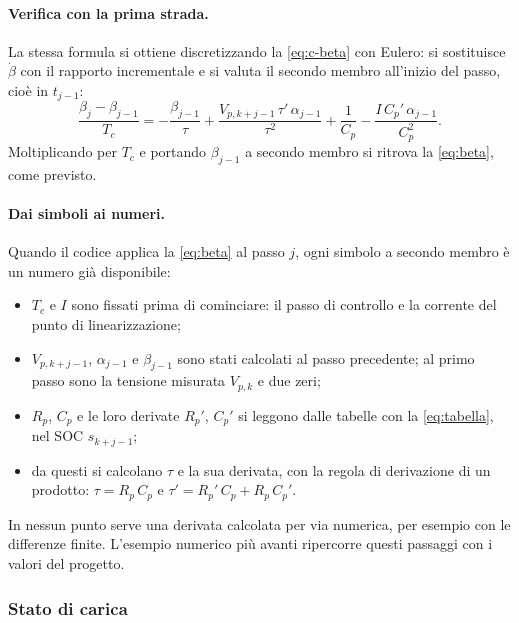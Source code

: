 \documentclass[11pt,a4paper]{article}
\newcommand{\Tc}{T_c}
\begin{document}
\paragraph{Verifica con la prima strada.} La stessa formula si ottiene
discretizzando la \eqref{eq:c-beta} con Eulero: si sostituisce $\dot\beta$ con
il rapporto incrementale e si valuta il secondo membro all'inizio del passo,
cioè in $t_{j-1}$:
\[
  \frac{\beta_j - \beta_{j-1}}{\Tc}
    = -\frac{\beta_{j-1}}{\tau}
      + \frac{V_{p,k+j-1}\,\tau'\,\alpha_{j-1}}{\tau^2}
      + \frac{1}{C_p}
      - \frac{I\,C_p'\,\alpha_{j-1}}{C_p^2} .
\]
Moltiplicando per $\Tc$ e portando $\beta_{j-1}$ a secondo membro si ritrova
la \eqref{eq:beta}, come previsto.

\paragraph{Dai simboli ai numeri.} Quando il codice applica la
\eqref{eq:beta} al passo $j$, ogni simbolo a secondo membro è un numero già
disponibile:
\begin{itemize}
  \item $\Tc$ e $I$ sono fissati prima di cominciare: il passo di controllo e
        la corrente del punto di linearizzazione;
  \item $V_{p,k+j-1}$, $\alpha_{j-1}$ e $\beta_{j-1}$ sono stati calcolati al
        passo precedente; al primo passo sono la tensione misurata $V_{p,k}$ e
        due zeri;
  \item $R_p$, $C_p$ e le loro derivate $R_p'$, $C_p'$ si leggono dalle
        tabelle con la \eqref{eq:tabella}, nel SOC $s_{k+j-1}$;
  \item da questi si calcolano $\tau$ e la sua derivata, con la regola di
        derivazione di un prodotto:
        $\tau = R_p\,C_p$ e $\tau' = R_p'\,C_p + R_p\,C_p'$.
\end{itemize}
In nessun punto serve una derivata calcolata per via numerica, per esempio con
le differenze finite. L'esempio numerico più avanti ripercorre questi passaggi
con i valori del progetto.

\subsubsection{Stato di carica}
\end{document}
